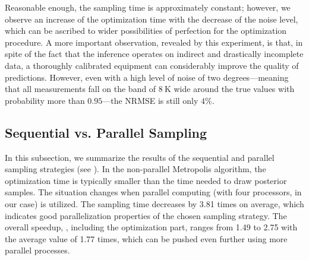 Reasonable enough, the sampling time is approximately constant; however, we observe an increase of the optimization time with the decrease of the noise level, which can be ascribed to wider possibilities of perfection for the optimization procedure.
A more important observation, revealed by this experiment, is that, in spite of the fact that the inference operates on indirect and drastically incomplete data, a thoroughly calibrated equipment can considerably improve the quality of predictions.
However, even with a high level of noise of two degrees---meaning that all measurements fall on the band of $8~\text{K}$ wide around the true values with probability more than $0.95$---the NRMSE is still only $4\%$.

\subsection{Sequential vs. Parallel Sampling}
In this subsection, we summarize the results of the sequential and parallel  sampling strategies (see ).
In the non-parallel Metropolis algorithm, the optimization time is typically smaller than the time needed to draw posterior samples.
The situation changes when parallel computing (with four processors, in our case) is utilized. The sampling time decreases by 3.81 times on average, which indicates good parallelization properties of the chosen sampling strategy.
The overall speedup, \ie, including the optimization part, ranges from 1.49 to 2.75 with the average value of 1.77 times, which can be pushed even further using more parallel processes.
